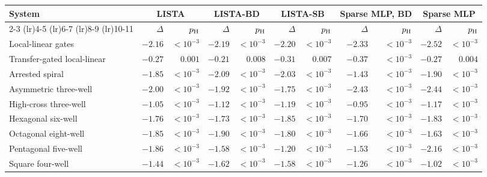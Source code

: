 \begin{tabular}{@{}l rr rr rr rr rr@{}}
\toprule
System & \multicolumn{2}{c}{LISTA} & \multicolumn{2}{c}{LISTA-BD} & \multicolumn{2}{c}{LISTA-SB} & \multicolumn{2}{c}{Sparse MLP, BD} & \multicolumn{2}{c}{Sparse MLP} \\
\cmidrule(lr){2-3} \cmidrule(lr){4-5} \cmidrule(lr){6-7} \cmidrule(lr){8-9} \cmidrule(lr){10-11}
 & $\Delta$ & $p_{\rm H}$ & $\Delta$ & $p_{\rm H}$ & $\Delta$ & $p_{\rm H}$ & $\Delta$ & $p_{\rm H}$ & $\Delta$ & $p_{\rm H}$ \\
\midrule
Local-linear gates & $\mathbf{-2.16}$ & $<\!10^{-3}$ & $\mathbf{-2.19}$ & $<\!10^{-3}$ & $\mathbf{-2.20}$ & $<\!10^{-3}$ & $\mathbf{-2.33}$ & $<\!10^{-3}$ & $\mathbf{-2.52}$ & $<\!10^{-3}$ \\
Transfer-gated local-linear & $\mathbf{-0.27}$ & $0.001$ & $\mathbf{-0.21}$ & $0.008$ & $\mathbf{-0.31}$ & $0.007$ & $\mathbf{-0.37}$ & $<\!10^{-3}$ & $\mathbf{-0.27}$ & $0.004$ \\
Arrested spiral & $\mathbf{-1.85}$ & $<\!10^{-3}$ & $\mathbf{-2.09}$ & $<\!10^{-3}$ & $\mathbf{-2.03}$ & $<\!10^{-3}$ & $\mathbf{-1.43}$ & $<\!10^{-3}$ & $\mathbf{-1.90}$ & $<\!10^{-3}$ \\
Asymmetric three-well & $\mathbf{-2.00}$ & $<\!10^{-3}$ & $\mathbf{-1.92}$ & $<\!10^{-3}$ & $\mathbf{-1.75}$ & $<\!10^{-3}$ & $\mathbf{-2.43}$ & $<\!10^{-3}$ & $\mathbf{-2.44}$ & $<\!10^{-3}$ \\
High-cross three-well & $\mathbf{-1.05}$ & $<\!10^{-3}$ & $\mathbf{-1.12}$ & $<\!10^{-3}$ & $\mathbf{-1.19}$ & $<\!10^{-3}$ & $\mathbf{-0.95}$ & $<\!10^{-3}$ & $\mathbf{-1.17}$ & $<\!10^{-3}$ \\
Hexagonal six-well & $\mathbf{-1.76}$ & $<\!10^{-3}$ & $\mathbf{-1.73}$ & $<\!10^{-3}$ & $\mathbf{-1.85}$ & $<\!10^{-3}$ & $\mathbf{-1.70}$ & $<\!10^{-3}$ & $\mathbf{-1.83}$ & $<\!10^{-3}$ \\
Octagonal eight-well & $\mathbf{-1.85}$ & $<\!10^{-3}$ & $\mathbf{-1.90}$ & $<\!10^{-3}$ & $\mathbf{-1.80}$ & $<\!10^{-3}$ & $\mathbf{-1.66}$ & $<\!10^{-3}$ & $\mathbf{-1.63}$ & $<\!10^{-3}$ \\
Pentagonal five-well & $\mathbf{-1.86}$ & $<\!10^{-3}$ & $\mathbf{-1.58}$ & $<\!10^{-3}$ & $\mathbf{-1.20}$ & $<\!10^{-3}$ & $\mathbf{-1.53}$ & $<\!10^{-3}$ & $\mathbf{-2.16}$ & $<\!10^{-3}$ \\
Square four-well & $\mathbf{-1.44}$ & $<\!10^{-3}$ & $\mathbf{-1.62}$ & $<\!10^{-3}$ & $\mathbf{-1.58}$ & $<\!10^{-3}$ & $\mathbf{-1.26}$ & $<\!10^{-3}$ & $\mathbf{-1.02}$ & $<\!10^{-3}$ \\

\end{tabular}
